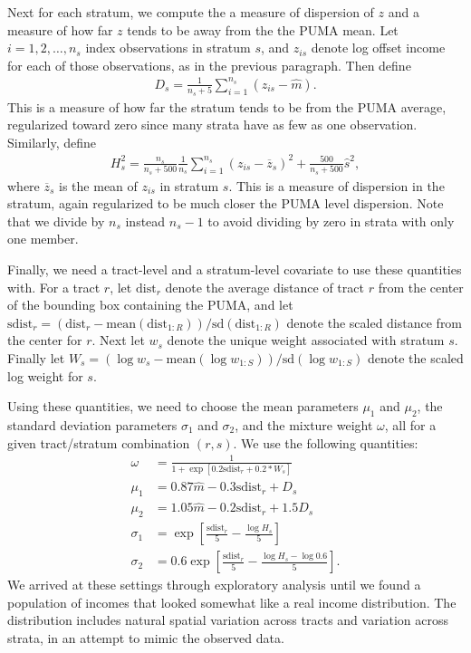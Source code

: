 \documentclass[12pt]{article}
\begin{document}
Next for each stratum, we compute the a measure of dispersion of $z$ and a measure of how far $z$ tends to be away from the the PUMA mean. Let $i=1,2,\dots,n_s$ index observations in stratum $s$, and $z_{is}$ denote log offset income for each of those observations, as in the previous paragraph. Then define
\begin{align*}
D_s = \frac{1}{n_s + 5}\sum_{i=1}^{n_s}(z_{is} - \widehat{m}).
\end{align*}
This is a measure of how far the stratum tends to be from the PUMA average, regularized toward zero since many strata have as few as one observation. Similarly, define
\begin{align*}
H_s^2 = \frac{n_s}{n_s + 500}\frac{1}{n_s}\sum_{i=1}^{n_s}(z_{is} - \overline{z}_s)^2 + \frac{500}{n_s + 500}\widehat{s}^2,
\end{align*}
where $\overline{z}_s$ is the mean of $z_{is}$ in stratum $s$. This is a measure of dispersion in the stratum, again regularized to be much closer the PUMA level dispersion. Note that we divide by $n_s$ instead $n_s - 1$ to avoid dividing by zero in strata with only one member.

Finally, we need a tract-level and a stratum-level covariate to use these quantities with. For a tract $r$, let $\mathrm{dist}_r$ denote the average distance of tract $r$ from the center of the bounding box containing the PUMA, and let $ \mathrm{sdist}_r = (\mathrm{dist}_r - \mathrm{mean}(\mathrm{dist}_{1:R}))/\mathrm{sd}(\mathrm{dist}_{1:R})$ denote the scaled distance from the center for $r$. Next let $w_s$ denote the unique weight associated with stratum $s$. Finally let $W_s = (\log w_s - \mathrm{mean}(\log w_{1:S})) / \mathrm{sd}(\log w_{1:S})$ denote the scaled log weight for $s$.

Using these quantities, we need to choose the mean parameters $\mu_1$ and $\mu_2$, the standard deviation parameters $\sigma_1$ and $\sigma_2$, and the mixture weight $\omega$, all for a given tract/stratum combination $(r,s)$. We use the following quantities:
\begin{align*}
  \omega &= \frac{1}{1 + \exp[0.2 \mathrm{sdist}_r + 0.2 * W_s]}\\
  \mu_1 &= 0.87\widehat{m} - 0.3 \mathrm{sdist}_r + D_s\\
  \mu_2 &= 1.05\widehat{m} - 0.2 \mathrm{sdist}_r + 1.5 D_s\\
  \sigma_1 & = \exp\left[\frac{\mathrm{sdist}_r}{5} - \frac{\log H_s}{5}\right]\\
  \sigma_2 & = 0.6\exp\left[\frac{\mathrm{sdist}_r}{5} - \frac{\log H_s - \log 0.6}{5}\right].
\end{align*}
We arrived at these settings through exploratory analysis until we found a population of incomes that looked somewhat like a real income distribution. The distribution includes natural spatial variation across tracts and variation across strata, in an attempt to mimic the observed data.
\end{document}
